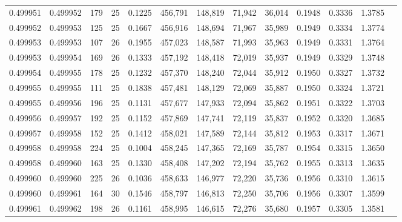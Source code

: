 \begin{tabular}{rrrrrrrrrrrrr}
0.499951 & 0.499952 & 179 &  25 &                                     0.1225 & 456,791 & 148,819 &  71,942 &  36,014 & 0.1948 & 0.3336 & 1.3785 \\
0.499952 & 0.499953 & 125 &  25 &                                     0.1667 & 456,916 & 148,694 &  71,967 &  35,989 & 0.1949 & 0.3334 & 1.3774 \\
0.499953 & 0.499953 & 107 &  26 &                                     0.1955 & 457,023 & 148,587 &  71,993 &  35,963 & 0.1949 & 0.3331 & 1.3764 \\
0.499953 & 0.499954 & 169 &  26 &                                     0.1333 & 457,192 & 148,418 &  72,019 &  35,937 & 0.1949 & 0.3329 & 1.3748 \\
0.499954 & 0.499955 & 178 &  25 &                                     0.1232 & 457,370 & 148,240 &  72,044 &  35,912 & 0.1950 & 0.3327 & 1.3732 \\
0.499955 & 0.499955 & 111 &  25 &                                     0.1838 & 457,481 & 148,129 &  72,069 &  35,887 & 0.1950 & 0.3324 & 1.3721 \\
0.499955 & 0.499956 & 196 &  25 &                                     0.1131 & 457,677 & 147,933 &  72,094 &  35,862 & 0.1951 & 0.3322 & 1.3703 \\
0.499956 & 0.499957 & 192 &  25 &                                     0.1152 & 457,869 & 147,741 &  72,119 &  35,837 & 0.1952 & 0.3320 & 1.3685 \\
0.499957 & 0.499958 & 152 &  25 &                                     0.1412 & 458,021 & 147,589 &  72,144 &  35,812 & 0.1953 & 0.3317 & 1.3671 \\
0.499958 & 0.499958 & 224 &  25 &                                     0.1004 & 458,245 & 147,365 &  72,169 &  35,787 & 0.1954 & 0.3315 & 1.3650 \\
0.499958 & 0.499960 & 163 &  25 &                                     0.1330 & 458,408 & 147,202 &  72,194 &  35,762 & 0.1955 & 0.3313 & 1.3635 \\
0.499960 & 0.499960 & 225 &  26 &                                     0.1036 & 458,633 & 146,977 &  72,220 &  35,736 & 0.1956 & 0.3310 & 1.3615 \\
0.499960 & 0.499961 & 164 &  30 &                                     0.1546 & 458,797 & 146,813 &  72,250 &  35,706 & 0.1956 & 0.3307 & 1.3599 \\
0.499961 & 0.499962 & 198 &  26 &                                     0.1161 & 458,995 & 146,615 &  72,276 &  35,680 & 0.1957 & 0.3305 & 1.3581 \\

\end{tabular}
